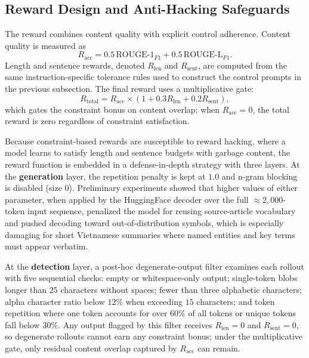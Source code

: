 \documentclass[11pt]{article}
\begin{document}
\subsection{Reward Design and Anti-Hacking Safeguards}
The reward combines content quality with explicit control adherence.
Content quality is measured as
\begin{equation}
R_{\text{acc}} = 0.5\,\mathrm{ROUGE\mbox{-}1}_{F1} + 0.5\,\mathrm{ROUGE\mbox{-}L}_{F1}.
\end{equation}
Length and sentence rewards, denoted $R_{\text{len}}$ and $R_{\text{sent}}$,
are computed from the same instruction-specific tolerance rules used to
construct the control prompts in the previous subsection.
The final reward uses a multiplicative gate:
\begin{equation}
R_{\text{total}} = R_{\text{acc}} \times \left(1 + 0.3 R_{\text{len}} + 0.2 R_{\text{sent}}\right),
\end{equation}
which gates the constraint bonus on content overlap: when $R_{\text{acc}}=0$, the
total reward is zero regardless of constraint satisfaction.

Because constraint-based rewards are susceptible to reward hacking, where a
model learns to satisfy length and sentence budgets with garbage content, the
reward function is embedded in a defense-in-depth strategy with three layers.
At the \textbf{generation} layer, the repetition penalty is kept at
$1.0$ and n-gram blocking is disabled (size $0$). Preliminary experiments
showed that higher values of either parameter, when applied by the
HuggingFace decoder over the full $\approx 2{,}000$-token input sequence,
penalized the model for reusing source-article vocabulary and pushed decoding
toward out-of-distribution symbols, which is especially damaging for short
Vietnamese summaries where named entities and key terms must appear verbatim.

At the \textbf{detection} layer, a post-hoc degenerate-output filter
examines each rollout with five sequential
checks: empty or whitespace-only output; single-token blobs longer than $25$
characters without spaces; fewer than three alphabetic characters; alpha
character ratio below $12\%$ when exceeding $15$ characters; and token
repetition where one token accounts for over $60\%$ of all tokens or unique
tokens fall below $30\%$. Any output flagged by this filter receives
$R_{\text{len}}=0$ and $R_{\text{sent}}=0$, so degenerate rollouts cannot
earn any constraint bonus; under the multiplicative gate, only residual
content overlap captured by $R_{\text{acc}}$ can remain.
\end{document}
